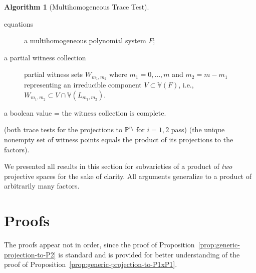 \documentclass[12pt]{amsart}
\theoremstyle{definition}
\newtheorem{algorithm}[theorem]{Algorithm}
\begin{document}
\begin{algorithm}[Multihomogeneous Trace Test]  \label{algorithm:multi-trace-test}
\label{algorithm:monodromy-breakup}
\ \newline
{} \vspace{-3pt} \begin{description}
  \item[equations] a multihomogeneous polynomial system $F$;
  \item[a partial witness collection]  partial witness sets $W_{m_1,m_2}$ where $m_1=0,\ldots,m$ and $m_2=m-m_1$
representing an irreducible component $V\subset{{\mathbb{V} \! \left({F}\right)}}$, i.e., $W_{m_1,m_2} \subset V\cap{{\mathbb{V} \! \left({L_{m_1,m_2}}\right)}}$.
\end{description}
 a boolean value = $\text{the witness collection is complete}$.
\begin{algorithmic}[1]
    \RETURN (both trace tests for the projections to ${{\mathbb{P}}}^{n_i}$ for $i=1,2$ pass) \AND (the unique nonempty set of witness points equals the product of its projections to the factors).
  \ELSE \RETURN \FALSE
  \ENDIF
\ELSE
   \RETURN \FALSE \ENDIF
  \ENDFOR
  \RETURN \TRUE
\ENDIF
\end{algorithmic}
\end{algorithm}

We presented all results in this section for subvarieties of a product of {\em two} projective spaces for the sake of clarity. All arguments generalize to a product of arbitrarily many factors.

\section{Proofs}\label{S:proofs}
The proofs appear not in order, since the proof of Proposition~\ref{prop:generic-projection-to-P2} is standard and is provided for better understanding of the proof of Proposition~\ref{prop:generic-projection-to-P1xP1}.
\end{document}
